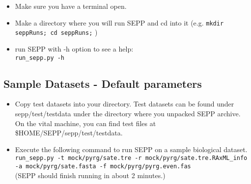 \documentclass[11pt]{article} %
\newcommand{\sepp}{SEPP\xspace}
\newcommand{\ins}[1]{{\tt #1}}
\newcommand{\file}[1]{{\sf #1}}
\begin{document}
\begin{itemize}
\item Make sure you have a terminal open.
\item Make a directory where you will run \sepp and cd into it (e.g. \ins{mkdir seppRuns; cd seppRuns;} )
\item run \sepp with -h option to see a help:\\
\ins{run\_sepp.py -h}
\end{itemize}


\subsection{Sample Datasets - Default parameters}
\begin{itemize}
\item Copy test datasets into your directory. Test datasets can be found under \file{sepp/test/testdata} under the directory where you unpacked \sepp archive. On the vital machine, you can find test files at \file{\$HOME/SEPP/sepp/test/testdata}. 
\item Execute the following command to run \sepp on a sample biological dataset.\\

\ins{run\_sepp.py -t mock/pyrg/sate.tre -r mock/pyrg/sate.tre.RAxML\_info -a mock/pyrg/sate.fasta -f mock/pyrg/pyrg.even.fas} \\

(\sepp should finish running in about 2 minutes.) 
\end{itemize}
\end{document}
